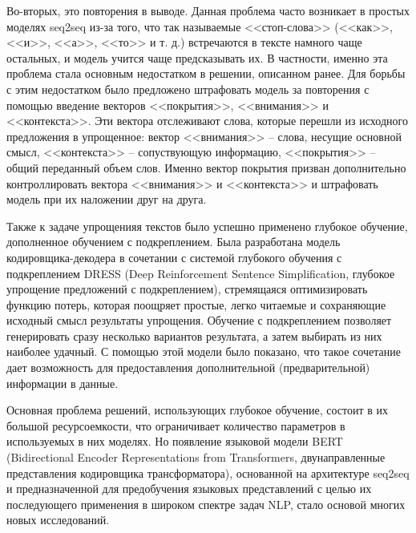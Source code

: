 Во-вторых, это повторения в выводе. Данная проблема часто возникает в простых моделях seq2seq из-за того, что так называемые <<стоп-слова>> (<<как>>, <<и>>, <<а>>, <<то>> и т. д.) встречаются в тексте намного чаще остальных, и модель учится чаще предсказывать их. В частности, именно эта проблема стала основным недостатком в решении, описанном ранее\cite{nisioi_exploring_2017}. Для борьбы с этим недостатком было предложено штрафовать модель за повторения с помощью введение векторов <<покрытия>>, <<внимания>> и <<контекста>>. Эти вектора отслеживают слова, которые перешли из исходного предложения в упрощенное: вектор <<внимания>> -- слова, несущие основной смысл, <<контекста>> -- сопуствующую информацию, <<покрытия>> -- общий переданный объем слов. Именно вектор покрытия призван дополнительно контроллировать вектора  <<внимания>> и <<контекста>> и штрафовать модель при их наложении друг на друга\cite{see_get_2017}.

Также к задаче упрощенияя текстов было успешно применено глубокое обучение, дополненное обучением с подкреплением\cite{zhang_sentence_2017}. Была разработана модель кодировщика-декодера в сочетании с системой глубокого обучения с подкреплением DRESS (Deep Reinforcement Sentence Simplification, глубокое упрощение предложений с подкреплением), стремящаяся оптимизировать функцию потерь, которая поощряет простые, легко читаемые и сохраняющие исходный смысл результаты упрощения. Обучение с подкреплением позволяет генерировать сразу несколько вариантов результата, а затем выбирать из них наиболее удачный. С помощью этой модели было показано, что такое сочетание дает возможность для предоставления дополнительной (предварительной) информации в данные.

Основная проблема решений, использующих глубокое обучение, состоит в их большой ресурсоемкости, что ограничивает количество параметров в используемых в них моделях. Но появление языковой модели BERT\cite{devlin_bert_2019} (Bidirectional Encoder Representations from Transformers, двунаправленные представления кодировщика трансформатора), основанной на архитектуре seq2seq и предназначенной для предобучения языковых представлений с целью их последующего применения в широком спектре задач NLP, стало основой многих новых исследований. 


